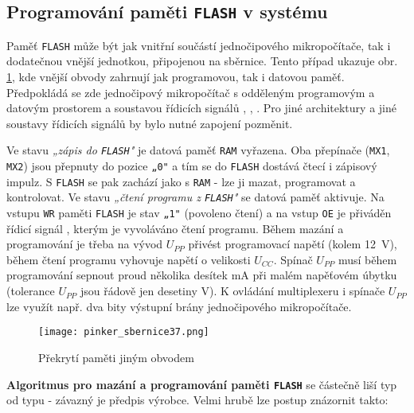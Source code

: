     \subsection{Programování paměti \texttt{FLASH} v systému}
      Paměť \texttt{FLASH} může být jak vnitřní součástí jednočipového mikropočítače, tak i 
      dodatečnou vnější jednotkou, připojenou na sběrnice. Tento případ ukazuje obr. 
      \ref{MIT:fig_sbernice37}, kde vnější obvody zahrnují jak programovou, tak i datovou paměť. 
      Předpokládá se zde jednočipový mikropočítač s odděleným programovým a datovým prostorem a 
      soustavou řídicích signálů , , 
      . Pro jiné architektury a jiné soustavy řídicích signálů by bylo 
      nutné zapojení pozměnit.
      
      Ve stavu \emph{„zápis do \texttt{FLASH}"} je datová paměť \texttt{RAM} vyřazena. Oba 
      přepínače (\texttt{MX1}, \texttt{MX2}) jsou přepnuty do pozice \texttt{„0"} a tím se do 
      \texttt{FLASH} dostává čtecí i zápisový impulz. S \texttt{FLASH} se pak zachází jako s 
      \texttt{RAM} - lze ji mazat, programovat a kontrolovat. Ve stavu \emph{„čtení programu z 
      \texttt{FLASH}"} se datová paměť aktivuje. Na vstupu \texttt{WR} paměti \texttt{FLASH} je 
      stav \texttt{„1"} (povoleno čtení) a na vstup \texttt{OE} je přiváděn řídicí signál 
      , kterým je vyvoláváno čtení programu. Během mazání a 
      programování je třeba na vývod \(U_{PP}\) přivést programovací napětí (kolem 
      \SI{12}{\volt}), během čtení programu vyhovuje napětí o velikosti \(U_{CC}\). Spínač 
      \(U_{PP}\) musí během programování sepnout proud několika desítek mA při malém napěťovém 
      úbytku (tolerance \(U_{PP}\) jsou řádově jen desetiny V). K ovládání multiplexeru i spínače 
      \(U_{PP}\) lze využít např. dva bity výstupní brány jednočipového mikropočítače.
      
      \begin{figure}[ht!] %
        \centering
        \texttt{[image: pinker\_sbernice37.png]}
        \caption{Překrytí paměti jiným obvodem}
        \label{MIT:fig_sbernice37}
      \end{figure}
      
      \textbf{Algoritmus pro mazání a programování paměti \texttt{FLASH}} se částečně liší typ od 
      typu - závazný je předpis výrobce. Velmi hrubě lze postup znázornit takto:
      
